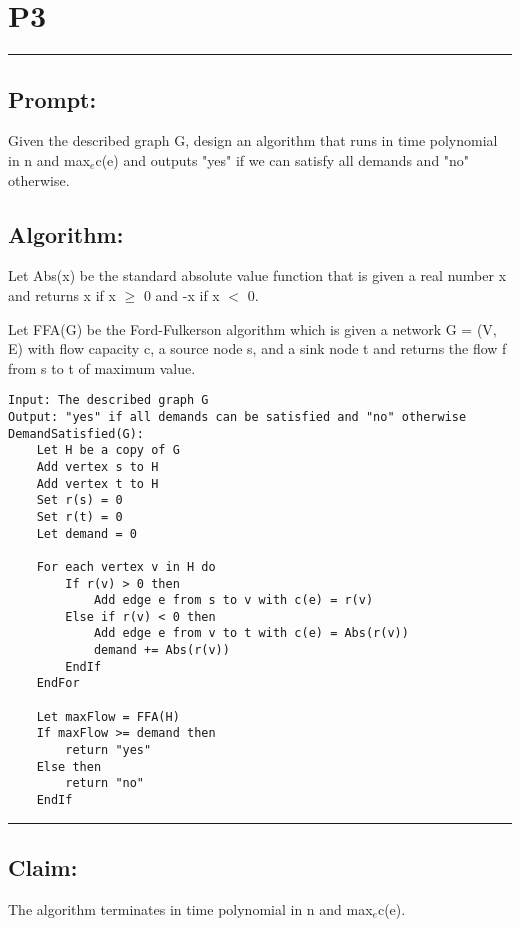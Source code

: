\documentclass[11pt]{article}
\title{}
\author{}
\date{}
\begin{document}
\section*{P3}

\noindent\textcolor[RGB]{220,220,220}{\rule{\linewidth}{0.8pt}}

\subsection*{Prompt:} 

Given the described graph G, design an algorithm that runs in time polynomial in n and max$_e$c(e) and outputs "yes" if we can satisfy all demands and "no" otherwise. 

\subsection*{Algorithm:}
Let Abs(x) be the standard absolute value function that is given a real number x and  returns x if x $\geq$ 0 and -x if x $<$ 0.

Let FFA(G) be the Ford-Fulkerson algorithm which is given a network G = (V, E) with flow capacity c, a source node s, and a sink node t and returns the flow f from s to t of maximum value. 

\begin{lstlisting}[basicstyle=\small, mathescape=true]
Input: The described graph G
Output: "yes" if all demands can be satisfied and "no" otherwise
DemandSatisfied(G):
	Let H be a copy of G
	Add vertex s to H
	Add vertex t to H
	Set r(s) = 0
	Set r(t) = 0
	Let demand = 0
	
	For each vertex v in H do
		If r(v) > 0 then
			Add edge e from s to v with c(e) = r(v)
		Else if r(v) < 0 then
			Add edge e from v to t with c(e) = Abs(r(v))
			demand += Abs(r(v))
		EndIf
	EndFor
	
	Let maxFlow = FFA(H)
	If maxFlow >= demand then
		return "yes"
	Else then
		return "no"
	EndIf
\end{lstlisting}

\noindent\textcolor[RGB]{220,220,220}{\rule{\linewidth}{0.8pt}}
\linebreak

\subsection*{Claim:} 

The algorithm terminates in time polynomial in n and max$_e$c(e).
\end{document}
